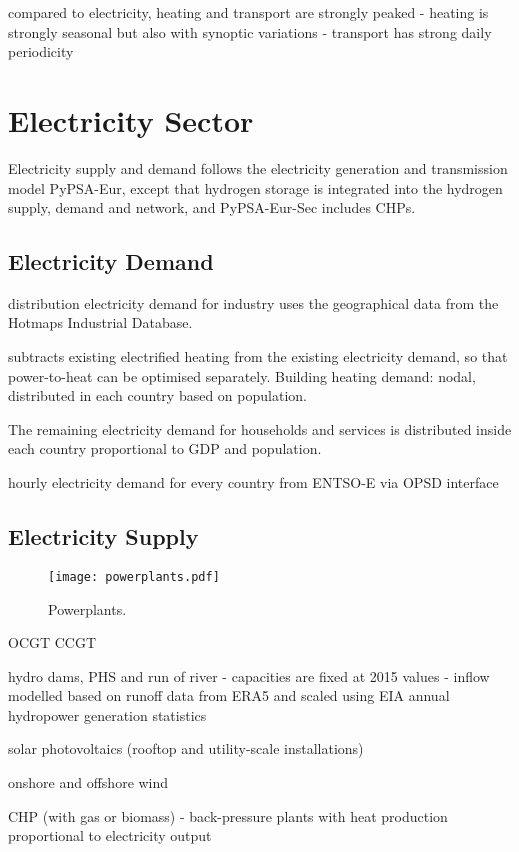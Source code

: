 compared to electricity, heating and transport are strongly peaked
- heating is strongly seasonal but also with synoptic variations
- transport has strong daily periodicity

\section{Electricity Sector}

Electricity supply and demand follows the electricity generation and
transmission model PyPSA-Eur, except that hydrogen storage is integrated into
the hydrogen supply, demand and network, and PyPSA-Eur-Sec includes CHPs.


\subsection{Electricity Demand}

distribution electricity demand for
industry uses the geographical data from
the Hotmaps Industrial Database.

subtracts existing electrified heating from
the existing electricity demand, so that power-to-heat can be optimised
separately.
Building heating demand: nodal, distributed in each country based on population.

The remaining electricity demand for households and services is distributed
inside each country proportional to GDP and population.

hourly electricity demand for every country from ENTSO-E via OPSD interface

\subsection{Electricity Supply}

\begin{SCfigure}
    \texttt{[image: powerplants.pdf]}
    \caption{Powerplants.}
\end{SCfigure}

OCGT CCGT

hydro dams, PHS and run of river
- capacities are fixed at 2015 values
- inflow modelled based on runoff data from ERA5 and scaled using EIA annual hydropower generation statistics

solar photovoltaics (rooftop and utility-scale installations)

onshore and offshore wind

CHP (with gas or biomass)
- back-pressure plants with heat production proportional to electricity output

